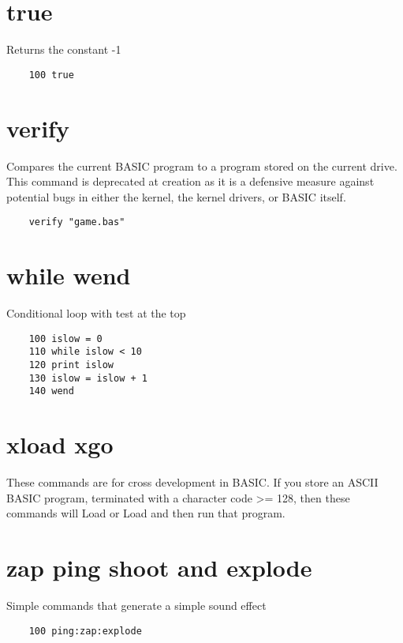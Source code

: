 \section*{true}
Returns the constant -1
\example{}
\begin{verbatim}
	100 true
\end{verbatim}

\section*{verify}
Compares the current BASIC program to a program stored on the current drive. This command is deprecated at creation as it is a defensive measure against potential bugs in either the kernel, the kernel drivers, or BASIC itself.
\example{}
\begin{verbatim}
	verify "game.bas"
\end{verbatim}

\section*{while wend}
Conditional loop with test at the top
\example{}
\begin{verbatim}
	100 islow = 0
	110 while islow < 10
	120 print islow
	130 islow = islow + 1
	140 wend
\end{verbatim}

\section*{xload xgo}
These commands are for cross development in BASIC. If you store an ASCII BASIC program, terminated with a character code >= 128, then these commands will Load or Load and then run that program.

\section*{zap ping shoot and explode}
Simple commands that generate a simple sound effect
\example{}
\begin{verbatim}
	100 ping:zap:explode
\end{verbatim}

